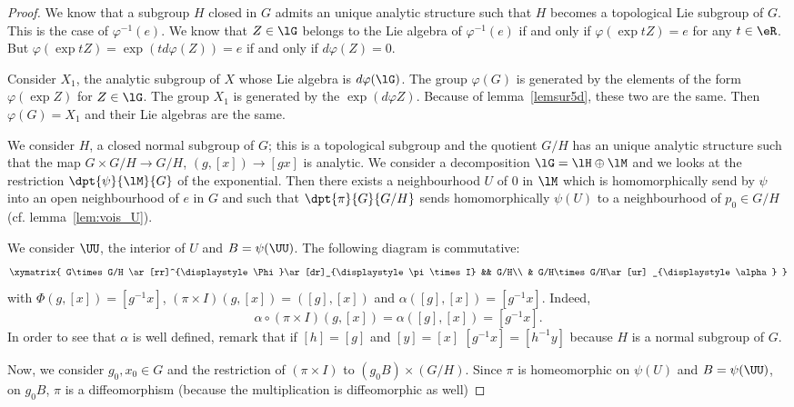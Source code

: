 \begin{proof}
	 We know that a subgroup $H$ closed in $G$ admits an unique analytic structure such that $H$ becomes a topological Lie subgroup of $G$. This is the case of $\varphi^{-1}(e)$. We know that $Z\in\lG$ belongs to the Lie algebra of $\varphi^{-1}(e)$ if and only if $\varphi(\exp tZ)=e$ for any $t\in\eR$. But $\varphi(\exp tZ)=\exp(td\varphi(Z))=e$ if and only if $d\varphi(Z)=0$.

	Consider $X_1$, the analytic subgroup of $X$ whose Lie algebra is $d\varphi(\lG)$. The group $\varphi(G)$ is generated by the elements of the form $\varphi(\exp Z)$ for $Z\in\lG$. The group $X_1$ is generated by the $\exp(d\varphi Z)$. Because of lemma~\ref{lemsur5d}, these two are the same. Then $\varphi(G)=X_1$ and their Lie algebras are the same.

	We consider $H$, a closed normal subgroup of $G$; this is a topological subgroup and the quotient $G/H$ has an unique analytic structure such that the map $G\times G/H\to G/H$, $(g,[x])\to [gx]$ is analytic. We consider a decomposition $\lG=\lH\oplus\lM$ and we looks at the restriction $\dpt{\psi}{\lM}{G}$ of the exponential. Then there exists a neighbourhood $U$ of $0$ in $\lM$ which is homomorphically send by  $\psi$ into an open neighbourhood of $e$ in $G$ and such that $\dpt{\pi}{G}{G/H}$ sends homomorphically $\psi(U)$ to a neighbourhood  of $p_0\in G/H$ (cf. lemma~\ref{lem:vois_U}).

	We consider $\UU$, the interior of $U$ and $B=\psi(\UU)$. The following diagram is commutative:
	\begin{equation}
		\xymatrix{
			G\times G/H  \ar[rr]^{\displaystyle\Phi}\ar[dr]_{\displaystyle \pi\times I} &&  G/H\\
			&     G/H\times G/H\ar[ur] _{\displaystyle\alpha}
		}
	\end{equation}
	with $\Phi(g,[x])=[g^{-1} x]$, $(\pi\times I)(g,[x])=([g],[x])$ and $\alpha([g],[x])=[g^{-1} x]$. Indeed,
	\[
		\alpha\circ(\pi\times I)(g,[x])=\alpha([g],[x])=[g^{-1} x].
	\]
	In order to see that $\alpha$ is well defined, remark that if $[h]=[g]$ and $[y]=[x]$ $[g^{-1} x]=[h^{-1} y]$ because $H$ is a normal subgroup of $G$.

	Now, we consider $g_0,x_0\in G$ and the restriction of $(\pi\times I)$ to $(g_0B)\times(G/H)$. Since $\pi$ is homeomorphic on $\psi(U)$ and $B=\psi(\UU)$, on $g_0B$, $\pi$ is a diffeomorphism (because the multiplication is diffeomorphic as well)


\end{proof}
